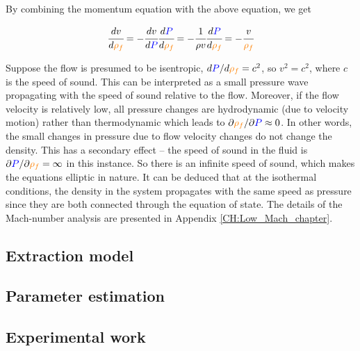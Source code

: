 \documentclass[a4paper,fleqn]{cas-dc}
\begin{document}
By combining the momentum equation with the above equation, we get

{\footnotesize
	\begin{equation} \label{EQ: Pressure_Velocity}
		\cfrac{d v}{d {\color{orange}\rho_f}} = - \cfrac{d v}{d{\color{blue}P}} \cfrac{d {\color{blue}P}}{d {\color{orange}\rho_f}} = -\cfrac{1}{\rho v} \cfrac{d{\color{blue}P}}{d{\color{orange}\rho_f}} = -\cfrac{v}{{\color{orange}\rho_f}}
	\end{equation}
}

Suppose the flow is presumed to be isentropic, $d{\color{blue}P}/d{\color{orange}\rho_f} = c^2$, so $v^2=c^2$, where $c$ is the speed of sound. This can be interpreted as a small pressure wave propagating with the speed of sound relative to the flow. Moreover, if the flow velocity is relatively low, all pressure changes are hydrodynamic (due to velocity motion) rather than thermodynamic which leads to $\partial {\color{orange}\rho_f} / \partial {\color{blue}P} \approx 0$. In other words, the small changes in pressure due to flow velocity changes do not change the density. This has a secondary effect -- the speed of sound in the fluid is $\partial {\color{blue}P}/\partial {\color{orange}\rho_f} = \infty$ in this instance. So there is an infinite speed of sound, which makes the equations elliptic in nature. It can be deduced that at the isothermal conditions, the density in the system propagates with the same speed as pressure since they are both connected through the equation of state. The details of the Mach-number analysis are presented in Appendix \ref{CH:Low_Mach_chapter}.

\subsection{Extraction model} \label{CH: Extraction_model}


%

\subsection{Parameter estimation} \label{CH: Parameter_estimation}


\subsection{Experimental work}

\end{document}
